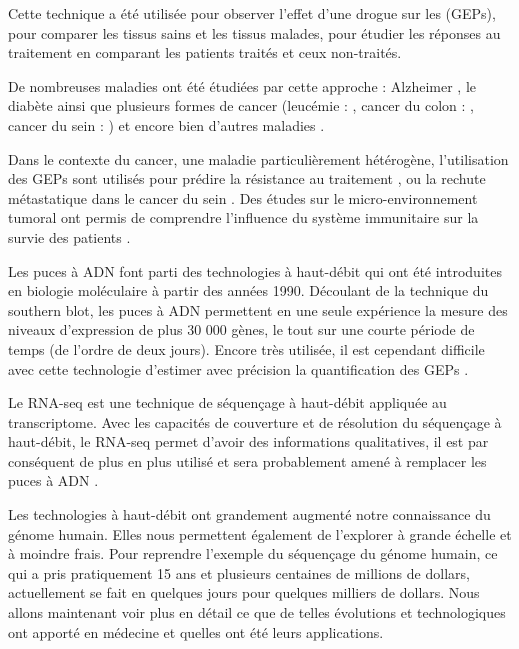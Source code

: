       Cette technique a été utilisée pour observer l'effet d'une drogue sur les (\acp{GEP}), pour comparer les tissus sains et les tissus malades, pour étudier les réponses au traitement en comparant les patients traités et ceux non-traités.

      De nombreuses maladies ont été étudiées par cette approche : Alzheimer \citep{Ricciarelli2004}, le diabète \citep{Kaestner2003} ainsi que plusieurs formes de cancer (leucémie : \citet{Golub1999}, cancer du colon : \citet{Li2001}, cancer du sein : \citet{Wang2005}) et encore bien d'autres maladies \citep{Munro2009}.

      Dans le contexte du cancer, une maladie particulièrement hétérogène, l'utilisation des \acp{GEP} sont utilisés pour prédire la résistance au traitement \citep{DeLavallade2010}, ou la rechute métastatique dans le cancer du sein \citep{vandevijver2002}.
      Des études sur le micro-environnement tumoral ont permis de comprendre l'influence du système immunitaire sur la survie des patients \citep{Pages2010}.

      Les puces à \acs{ADN} font parti des technologies à haut-débit qui ont été introduites en biologie moléculaire à partir des années 1990.
      Découlant de la technique du southern blot, les puces à \acs{ADN} permettent en une seule expérience la mesure des niveaux d'expression de plus 30 000 gènes, le tout sur une courte période de temps (de l'ordre de deux jours).
      Encore très utilisée, il est cependant difficile avec cette technologie d'estimer avec précision la quantification des \acp{GEP} \citep{Heller2002, Hardiman2004, Wang2005b, Zakharkin2005, Draghici2006}.
      \pagebreak

      Le \acs{RNA}-seq est une technique de séquençage à haut-débit appliquée au transcriptome.
      Avec les capacités de couverture et de résolution du séquençage à haut-débit, le \acs{RNA}-seq permet d'avoir des informations qualitatives, il est par conséquent de plus en plus utilisé et sera probablement amené à remplacer les puces à \acs{ADN} \citep{Maher2009, Fu2009, Wang2009, Sirbu2012}.

      Les technologies à haut-débit ont grandement augmenté notre connaissance du génome humain.
      Elles nous permettent également de l'explorer à grande échelle et à moindre frais.
      Pour reprendre l'exemple du séquençage du génome humain, ce qui a pris pratiquement 15 ans et plusieurs centaines de millions de dollars, actuellement se fait en quelques jours pour quelques milliers de dollars.
      Nous allons maintenant voir plus en détail ce que de telles évolutions et technologiques ont apporté en médecine et quelles ont été leurs applications.

